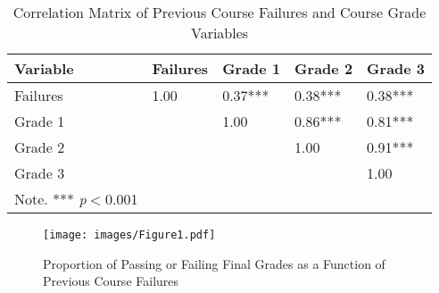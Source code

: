 \documentclass[sigconf]{acmart}
\begin{document}
\begin{table}
  \caption{Correlation Matrix of Previous Course Failures and Course Grade 
  Variables}
  \label{tab:freq}
  \begin{tabular}{lllll}
    \toprule
    Variable    & Failures  & Grade 1 & Grade 2 & Grade 3  \\
    \midrule
    Failures    &  1.00     &  0.37***  & 0.38***   &  0.38***  \\
    Grade 1     &           &  1.00     & 0.86***   &  0.81***  \\
    Grade 2     &           &           & 1.00      &  0.91***  \\  
    Grade 3     &           &           &           &  1.00     \\    
    \bottomrule
    Note. *** \textit{p}$<$0.001 & & &
  \end{tabular}
\end{table}


\begin{figure}[!ht]
  \centering\texttt{[image: images/Figure1.pdf]}
  \caption{Proportion of Passing or Failing Final Grades as a 
  Function of Previous Course Failures}
  \label{f:Figure1}
\end{figure} 
 
 
\end{document}
